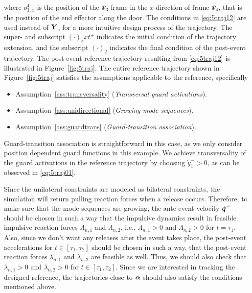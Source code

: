 \documentclass[../DC2019003Bouma.tex]{subfiles}
\begin{document}
where $o_{3,x}^4$ is the position of the $\Psi_3$ frame in the $x$-direction of frame $\Psi_4$, that is the position of the end effector along the door. The conditions in \eqref{eq:5traj12} are used instead of ${\boldsymbol{Y}}$, for a more intuitive design process of the trajectory. The super- and subscript $(\cdot)_ext^+$ indicates the initial condition of the trajectory extension, and the subscript $(\cdot)_2$ indicates the final condition of the post-event trajectory. The post-event reference trajectory resulting from \eqref{eq:5traj12} is illustrated in Figure~\ref{fig:5traj}. The entire reference trajectory shown in Figure~\ref{fig:5traj} satisfies the assumptions applicable to the reference, specifically
\begin{itemize}
\item Assumption~\ref{ass:transversality} (\textit{Transversal guard activations}).
\item Assumption~\ref{ass:unidirectional} (\textit{Growing mode sequences}).
\item Assumption~\ref{ass:guardtrans} (\textit{Guard-transition association}).
\end{itemize}
Guard-transition association is straightforward in this case, as we only consider position dependent guard functions in this example. We achieve transversality of the guard activations in the reference trajectory by choosing $\dot{y}^-_1>0$, as can be observed in \eqref{eq:5traj01}. 

Since the unilateral constraints are modeled as bilateral constraints, the simulation will return pulling reaction forces when a release occurs. Therefore, to make sure that the mode sequences are growing, the ante-event velocity $\dot{{\boldsymbol{q}}}^-$ should be chosen in such a way that the impulsive dynamics result in feasible impulsive reaction forces $\Lambda_{n,1}$ and $\Lambda_{n,2}$, i.e., $\Lambda_{n,1}>0$ and $\Lambda_{n,2}>0$ for $t = \tau_1$.  Also, since we don't want any releases after the event takes place, the post-event accelerations for $t\in[\tau_1,\tau_2]$ should be chosen in such a way, that the post-event reaction forces $\lambda_{n,1}$ and $\lambda_{n,2}$ are feasible as well. Thus, we should also check that $\lambda_{n,1}>0$ and $\lambda_{n,2}>0$ for $t\in[\tau_1,\tau_2]$. Since we are interested in tracking the designed reference, the trajectories close to $\boldsymbol{\alpha}$ should also satisfy the conditions mentioned above.
\end{document}
